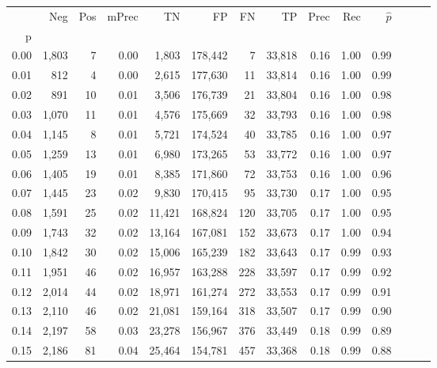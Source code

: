 \begin{tabular}{rrrrrrrrrrrrrr}
\toprule
{} &    Neg &  Pos & mPrec &       TN &       FP &      FN &      TP &  Prec &   Rec & $\hat{p}$ \\
p    &        &      &       &          &          &         &         &       &       &           \\
\midrule
0.00 &  1,803 &    7 &  0.00 &    1,803 &  178,442 &       7 &  33,818 &  0.16 &  1.00 &      0.99 \\
0.01 &    812 &    4 &  0.00 &    2,615 &  177,630 &      11 &  33,814 &  0.16 &  1.00 &      0.99 \\
0.02 &    891 &   10 &  0.01 &    3,506 &  176,739 &      21 &  33,804 &  0.16 &  1.00 &      0.98 \\
0.03 &  1,070 &   11 &  0.01 &    4,576 &  175,669 &      32 &  33,793 &  0.16 &  1.00 &      0.98 \\
0.04 &  1,145 &    8 &  0.01 &    5,721 &  174,524 &      40 &  33,785 &  0.16 &  1.00 &      0.97 \\
0.05 &  1,259 &   13 &  0.01 &    6,980 &  173,265 &      53 &  33,772 &  0.16 &  1.00 &      0.97 \\
0.06 &  1,405 &   19 &  0.01 &    8,385 &  171,860 &      72 &  33,753 &  0.16 &  1.00 &      0.96 \\
0.07 &  1,445 &   23 &  0.02 &    9,830 &  170,415 &      95 &  33,730 &  0.17 &  1.00 &      0.95 \\
0.08 &  1,591 &   25 &  0.02 &   11,421 &  168,824 &     120 &  33,705 &  0.17 &  1.00 &      0.95 \\
0.09 &  1,743 &   32 &  0.02 &   13,164 &  167,081 &     152 &  33,673 &  0.17 &  1.00 &      0.94 \\
0.10 &  1,842 &   30 &  0.02 &   15,006 &  165,239 &     182 &  33,643 &  0.17 &  0.99 &      0.93 \\
0.11 &  1,951 &   46 &  0.02 &   16,957 &  163,288 &     228 &  33,597 &  0.17 &  0.99 &      0.92 \\
0.12 &  2,014 &   44 &  0.02 &   18,971 &  161,274 &     272 &  33,553 &  0.17 &  0.99 &      0.91 \\
0.13 &  2,110 &   46 &  0.02 &   21,081 &  159,164 &     318 &  33,507 &  0.17 &  0.99 &      0.90 \\
0.14 &  2,197 &   58 &  0.03 &   23,278 &  156,967 &     376 &  33,449 &  0.18 &  0.99 &      0.89 \\
0.15 &  2,186 &   81 &  0.04 &   25,464 &  154,781 &     457 &  33,368 &  0.18 &  0.99 &      0.88 \\

\end{tabular}

